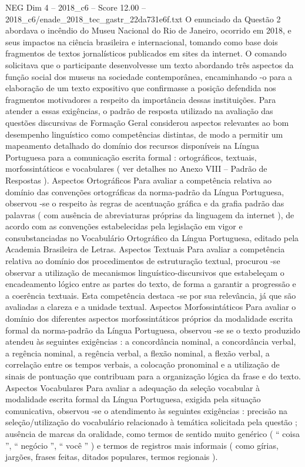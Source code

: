 \begin{textsample}{NEG Dim 4 – 2018\_c6 – Score 12.00 – 2018\_c6/enade\_2018\_tec\_gastr\_22da731e6f.txt}
O enunciado da Questão 2 abordava o incêndio do Museu Nacional do Rio de Janeiro, ocorrido em 2018, e seus impactos na ciência brasileira e internacional, tomando como base dois fragmentos de textos jornalísticos publicados em sites da internet.
O comando solicitava que o participante desenvolvesse um texto abordando três aspectos da função social dos museus na sociedade contemporânea, encaminhando -o para a elaboração de um texto expositivo que confirmasse a posição defendida nos fragmentos motivadores a respeito da importância dessas instituições.
Para atender a essas exigências, o padrão de resposta utilizado na avaliação das questões discursivas de Formação Geral considerou aspectos relevantes ao bom desempenho linguístico como competências distintas, de modo a permitir um mapeamento detalhado do domínio dos recursos disponíveis na Língua Portuguesa para a comunicação escrita formal : ortográficos, textuais, morfossintáticos e vocabulares ( ver detalhes no Anexo VIII – Padrão de Respostas ).
Aspectos Ortográficos Para avaliar a competência relativa ao domínio das convenções ortográficas da norma-padrão da Língua Portuguesa, observou -se o respeito às regras de acentuação gráfica e da grafia padrão das palavras ( com ausência de abreviaturas próprias da linguagem da internet ), de acordo com as convenções estabelecidas pela legislação em vigor e consubstanciadas no Vocabulário Ortográfico da Língua Portuguesa, editado pela Academia Brasileira de Letras.
Aspectos Textuais Para avaliar a competência relativa ao domínio dos procedimentos de estruturação textual, procurou -se observar a utilização de mecanismos linguístico-discursivos que estabeleçam o encadeamento lógico entre as partes do texto, de forma a garantir a progressão e a coerência textuais.
Esta competência destaca -se por sua relevância, já que são avaliadas a clareza e a unidade textual.
Aspectos Morfossintáticos Para avaliar o domínio dos diferentes aspectos morfossintáticos próprios da modalidade escrita formal da norma-padrão da Língua Portuguesa, observou -se se o texto produzido atendeu às seguintes exigências : a concordância nominal, a concordância verbal, a regência nominal, a regência verbal, a flexão nominal, a flexão verbal, a correlação entre os tempos verbais, a colocação pronominal e a utilização de sinais de pontuação que contribuam para a organização lógica da frase e do texto.
Aspectos Vocabulares Para avaliar a adequação da seleção vocabular à modalidade escrita formal da Língua Portuguesa, exigida pela situação comunicativa, observou -se o atendimento às seguintes exigências : precisão na seleção/utilização do vocabulário relacionado à temática solicitada pela questão ; ausência de marcas da oralidade, como termos de sentido muito genérico ( “ coisa ”, “ negócio ”, “ você ” ) e termos de registros mais informais ( como gírias, jargões, frases feitas, ditados populares, termos regionais ).

\end{textsample}
